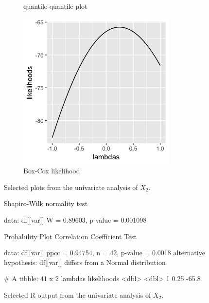 \begin{figure}[H]
\begin{subfigure}{.33\textwidth}
  \caption{quantile-quantile plot}
  \label{fig:sfig2}
\end{subfigure}
\begin{subfigure}{.33\textwidth}
  \centering
  \includegraphics[width=.8\linewidth]{plot_4_29_X2bxcx.png}
  \caption{Box-Cox likelihood}
  \label{fig:sfig3}
\end{subfigure}%
\caption{Selected plots from the univariate analysis of $X_2$.} 
\end{figure}
\begin{figure}[H]
\begin{rc}
	Shapiro-Wilk normality test

data:  df[[var]]
W = 0.89603, p-value = 0.001098


	Probability Plot Correlation Coefficient Test

data:  df[[var]]
ppcc = 0.94754, n = 42, p-value = 0.0018
alternative hypothesis: df[[var]] differs from a Normal distribution

# A tibble: 41 x 2
  lambdas likelihoods
    <dbl>       <dbl>
1    0.25       -65.8
\end{rc}
\caption{Selected R output from the univariate analysis of $X_2$.}
\end{figure}
